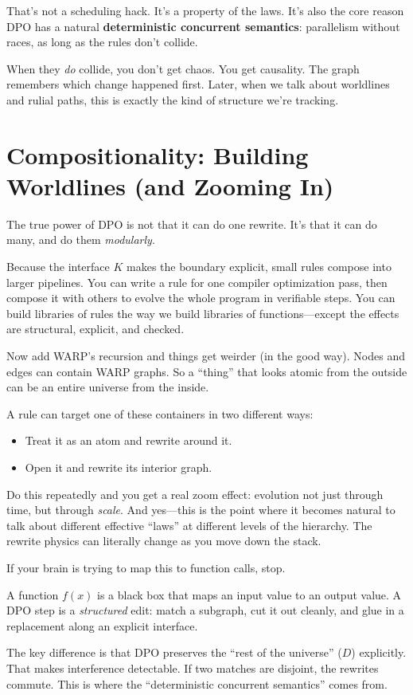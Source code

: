 That's not a scheduling hack. It's a property of the laws.
It's also the core reason DPO has a natural \textbf{deterministic concurrent semantics}: parallelism without races, as long as the rules don't collide.

When they \textit{do} collide, you don't get chaos. You get causality.
The graph remembers which change happened first. Later, when we talk about worldlines and rulial paths, this is exactly the kind of structure we're tracking.

\section{Compositionality: Building Worldlines (and Zooming In)}
\label{sec:compositionality}

The true power of DPO is not that it can do one rewrite. It's that it can do many, and do them \emph{modularly}.

Because the interface $K$ makes the boundary explicit, small rules compose into larger pipelines.
You can write a rule for one compiler optimization pass, then compose it with others to evolve the whole program in verifiable steps.
You can build libraries of rules the way we build libraries of functions---except the effects are structural, explicit, and checked.

Now add WARP's recursion and things get weirder (in the good way).
Nodes and edges can contain WARP graphs.
So a ``thing'' that looks atomic from the outside can be an entire universe from the inside.

A rule can target one of these containers in two different ways:

\begin{itemize}
    \item Treat it as an atom and rewrite around it.
    \item Open it and rewrite its interior graph.
\end{itemize}

Do this repeatedly and you get a real zoom effect: evolution not just through time, but through \emph{scale}.
And yes---this is the point where it becomes natural to talk about different effective ``laws'' at different levels of the hierarchy. The rewrite physics can literally change as you move down the stack.

\begin{tcolorbox}[colback=white, colframe=black, title=FOR THE NERDS™]
If your brain is trying to map this to function calls, stop.

A function $f(x)$ is a black box that maps an input value to an output value.
A DPO step is a \emph{structured} edit: match a subgraph, cut it out cleanly, and glue in a replacement along an explicit interface.

The key difference is that DPO preserves the ``rest of the universe'' ($D$) explicitly. That makes interference detectable.
If two matches are disjoint, the rewrites commute. This is where the ``deterministic concurrent semantics'' comes from.
\end{tcolorbox}

